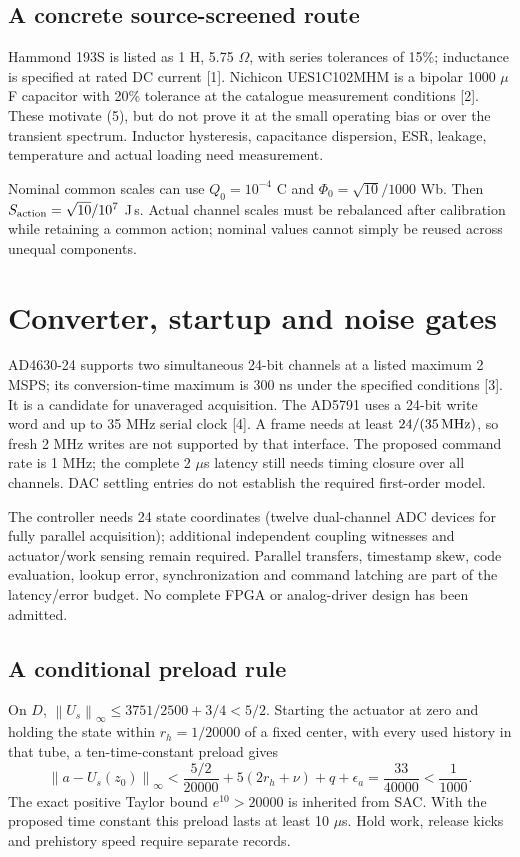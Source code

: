 \documentclass[10pt,a4paper]{article}
\newcommand{\norm}[1]{\left\|#1\right\|_\infty}
\begin{document}
\subsection*{A concrete source-screened route}
Hammond 193S is listed as 1 H, 5.75 $\Omega$, with series tolerances of 15\%; inductance is specified at rated DC current [1]. Nichicon UES1C102MHM is a bipolar 1000 $\mu$F capacitor with 20\% tolerance at the catalogue measurement conditions [2]. These motivate (5), but do not prove it at the small operating bias or over the transient spectrum. Inductor hysteresis, capacitance dispersion, ESR, leakage, temperature and actual loading need measurement.

Nominal common scales can use $Q_0=10^{-4}$ C and $\Phi_0=\sqrt{10}/1000$ Wb. Then $S_{\rm action}=\sqrt{10}/10^7$ J\,s. Actual channel scales must be rebalanced after calibration while retaining a common action; nominal values cannot simply be reused across unequal components.
\newpage
\section{Converter, startup and noise gates}
AD4630-24 supports two simultaneous 24-bit channels at a listed maximum 2 MSPS; its conversion-time maximum is 300 ns under the specified conditions [3]. It is a candidate for unaveraged acquisition. The AD5791 uses a 24-bit write word and up to 35 MHz serial clock [4]. A frame needs at least $24/(35\,{\rm MHz})$, so fresh 2 MHz writes are not supported by that interface. The proposed command rate is 1 MHz; the complete 2 $\mu$s latency still needs timing closure over all channels. DAC settling entries do not establish the required first-order model.

The controller needs 24 state coordinates (twelve dual-channel ADC devices for fully parallel acquisition); additional independent coupling witnesses and actuator/work sensing remain required. Parallel transfers, timestamp skew, code evaluation, lookup error, synchronization and command latching are part of the latency/error budget. No complete FPGA or analog-driver design has been admitted.

\subsection*{A conditional preload rule}
On $D$, $\norm{U_s}\leq3751/2500+3/4<5/2$. Starting the actuator at zero and holding the state within $r_h=1/20000$ of a fixed center, with every used history in that tube, a ten-time-constant preload gives
\begin{equation}
\norm{a-U_s(z_0)}
<\frac{5/2}{20000}+5(2r_h+\nu)+q+\epsilon_a
=\frac{33}{40000}<\frac1{1000}.
\end{equation}
The exact positive Taylor bound $e^{10}>20000$ is inherited from SAC. With the proposed time constant this preload lasts at least 10 $\mu$s. Hold work, release kicks and prehistory speed require separate records.
\end{document}
